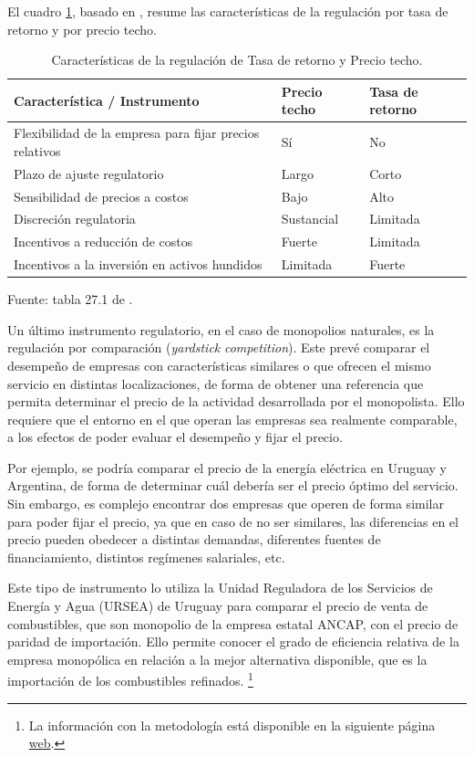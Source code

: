 \documentclass[
  12pt,
  spanish,
]{book}
\begin{document}
El cuadro \ref{tab:cuadro3}, basado en \citet{Armstrong2007}, resume las características de la regulación por tasa de retorno y por precio techo.

\begin{table}

\caption{\label{tab:cuadro3}Características de la regulación de Tasa de retorno y Precio techo.}
\centering
\begin{tabular}[t]{l|l|l}
\hline
Característica / Instrumento & Precio techo & Tasa de retorno\\
\hline
Flexibilidad de la empresa para fijar precios relativos & Sí & No\\
\hline
Plazo de ajuste regulatorio & Largo & Corto\\
\hline
Sensibilidad de precios a costos & Bajo & Alto\\
\hline
Discreción regulatoria & Sustancial & Limitada\\
\hline
Incentivos a reducción de costos & Fuerte & Limitada\\
\hline
Incentivos a la inversión en activos hundidos & Limitada & Fuerte\\
\hline
\end{tabular}
\end{table}

Fuente: tabla 27.1 de \citet{Armstrong2007}.

Un último instrumento regulatorio, en el caso de monopolios naturales, es la regulación por comparación (\emph{yardstick} \emph{competition}). Este prevé comparar el desempeño de empresas con características similares o que ofrecen el mismo servicio en distintas localizaciones, de forma de obtener una referencia que permita determinar el precio de la actividad desarrollada por el monopolista. Ello requiere que el entorno en el que operan las empresas sea realmente comparable, a los efectos de poder evaluar el desempeño y fijar el precio.

Por ejemplo, se podría comparar el precio de la energía eléctrica en Uruguay y Argentina, de forma de determinar cuál debería ser el precio óptimo del servicio. Sin embargo, es complejo encontrar dos empresas que operen de forma similar para poder fijar el precio, ya que en caso de no ser similares, las diferencias en el precio pueden obedecer a distintas demandas, diferentes fuentes de financiamiento, distintos regímenes salariales, etc.

Este tipo de instrumento lo utiliza la Unidad Reguladora de los Servicios de Energía y Agua (URSEA) de Uruguay para comparar el precio de venta de combustibles, que son monopolio de la empresa estatal ANCAP, con el precio de paridad de importación. Ello permite conocer el grado de eficiencia relativa de la empresa monopólica en relación a la mejor alternativa disponible, que es la importación de los combustibles refinados.
\footnote{La información con la metodología está disponible en la siguiente página \href{https://www.gub.uy/unidad-reguladora-servicios-energia-agua/sites/unidad-reguladora-servicios-energia-agua/files/2019-12/Metodologia_PPI_diciembre_2017_0\%281\%29.pdf}{web}.}
\end{document}
